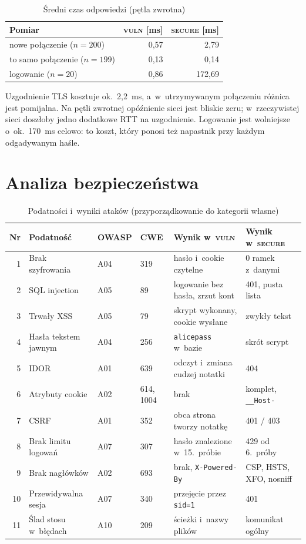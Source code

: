 \documentclass[12pt,a4paper]{article}
\newcommand{\kod}[1]{\texttt{#1}}
\newcommand{\vuln}{\textsc{vuln}}
\newcommand{\secure}{\textsc{secure}}
\begin{document}
\begin{table}[H]\centering\caption{Średni czas odpowiedzi (pętla zwrotna)}\label{tab:czas}
\begin{tabular}{lrr}
\toprule
Pomiar & \vuln{} [ms] & \secure{} [ms]\\\midrule
nowe połączenie ($n=200$) & 0{,}57 & 2{,}79\\
to samo połączenie ($n=199$) & 0{,}13 & 0{,}14\\
logowanie ($n=20$) & 0{,}86 & 172{,}69\\
\bottomrule
\end{tabular}
\end{table}
Uzgodnienie TLS kosztuje ok.~2{,}2~ms, a~w~utrzymywanym połączeniu różnica jest pomijalna. Na pętli zwrotnej opóźnienie sieci jest bliskie zeru; w~rzeczywistej sieci doszłoby jedno dodatkowe RTT na uzgodnienie. Logowanie jest wolniejsze o~ok.~170~ms celowo: to koszt, który ponosi też napastnik przy każdym odgadywanym haśle.

\section{Analiza bezpieczeństwa}

\begin{table}[H]\centering\footnotesize\caption{Podatności i~wyniki ataków (przyporządkowanie do kategorii własne)}\label{tab:podat}
\begin{tabularx}{\linewidth}{rL{3.3cm}llXX}
\toprule
Nr & Podatność & OWASP & CWE & Wynik w~\vuln & Wynik w~\secure\\ & Brak szyfrowania & A04 & 319 & hasło i~cookie czytelne & 0 ramek z~danymi\\
2 & SQL injection & A05 & 89 & logowanie bez hasła, zrzut kont & 401, pusta lista\\
3 & Trwały XSS & A05 & 79 & skrypt wykonany, cookie wysłane & zwykły tekst\\
4 & Hasła tekstem jawnym & A04 & 256 & \kod{alicepass} w~bazie & skrót scrypt\\
5 & IDOR & A01 & 639 & odczyt i~zmiana cudzej notatki & 404\\
6 & Atrybuty cookie & A02 & 614, 1004 & brak & komplet, \kod{\_\_Host-}\\
7 & CSRF & A01 & 352 & obca strona tworzy notatkę & 401 / 403\\
8 & Brak limitu logowań & A07 & 307 & hasło znalezione w~15.~próbie & 429 od 6.~próby\\
9 & Brak nagłówków & A02 & 693 & brak, \kod{X-Powered-By} & CSP, HSTS, XFO, nosniff\\
10 & Przewidywalna sesja & A07 & 340 & przejęcie przez \kod{sid=1} & 401\\
11 & Ślad stosu w~błędach & A10 & 209 & ścieżki i~nazwy plików & komunikat ogólny\\
\bottomrule
\end{tabularx}
\end{table}
\end{document}

